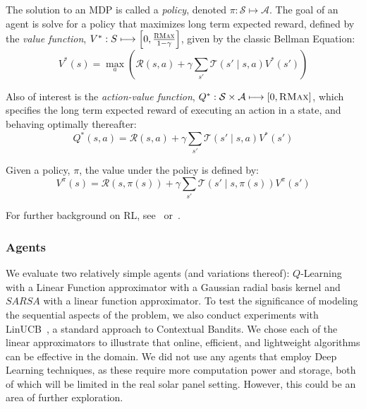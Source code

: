\documentclass{article}
\newcommand{\mc}{\mathcal}
\begin{document}
{The solution to an MDP is called a {\it policy}, denoted $\pi : \mc{S} \longmapsto \mc{A}$. The goal of an agent is solve for a policy that maximizes long term expected reward, defined by the {\it value function}, $V^* : S \longmapsto \left[0,\frac{\textsc{RMax}}{1-\gamma}\right]$, given by the classic Bellman Equation:
\begin{equation}
V^*(s) = \max_a \left(\mc{R}(s,a) + \gamma \sum_{s'} \mc{T}(s' \mid s, a) V^*(s') \right)
\end{equation}

Also of interest is the {\it action-value function}, $Q^*: \mc{S} \times \mc{A} \longmapsto [0,\textsc{RMax}]$, which specifies the long term expected reward of executing an action in a state, and behaving optimally thereafter:
\begin{equation}
Q^*(s,a) = \mc{R}(s,a) + \gamma \sum_{s'} \mc{T}(s' \mid s,a) V^*(s')
\end{equation}

Given a policy, $\pi$, the value under the policy is defined by:
\begin{equation}
V^\pi(s) = \mc{R}(s, \pi(s)) + \gamma \sum_{s'} \mc{T}(s' \mid s, \pi(s)) V^\pi(s')
\end{equation}

For further background on RL, see~\citet{sutton1998reinforcement} or~\citet{kaelbling1996reinforcement}.

\subsubsection{Agents}
We evaluate two relatively simple agents (and variations thereof): $Q$-Learning with a Linear Function approximator with a Gaussian radial basis kernel and $SARSA$ with a linear function approximator. To test the significance of modeling the sequential aspects of the problem, we also conduct experiments with LinUCB~\cite{li2010contextual}, a standard approach to Contextual Bandits. We chose each of the linear approximators to illustrate that online, efficient, and lightweight algorithms can be effective in the domain. We did not use any agents that employ Deep Learning techniques, as these require more computation power and storage, both of which will be limited in the real solar panel setting. However, this could be an area of further exploration.

}
\end{document}
